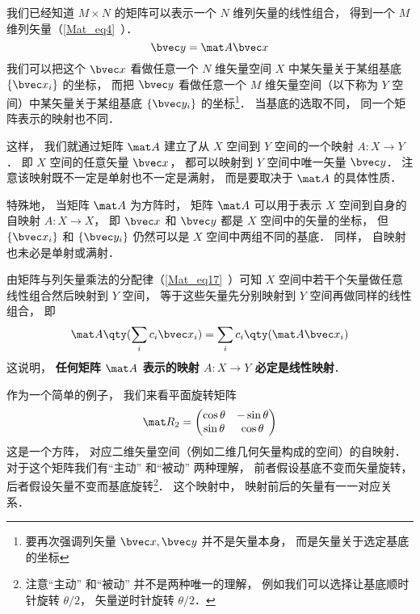 


我们已经知道 $M\times N$ 的矩阵可以表示一个 $N$ 维列矢量的线性组合， 得到一个 $M$ 维列矢量（\autoref{Mat_eq4}~）．
\begin{equation}\label{MatLS_eq1}
\bvec y = \mat A \bvec x
\end{equation}
我们可以把这个 $\bvec x$ 看做任意一个 $N$ 维矢量空间 $X$ 中某矢量关于某组基底 $\{\bvec x_i\}$ 的坐标， 而把 $\bvec y$ 看做任意一个 $M$ 维矢量空间（以下称为 $Y$ 空间）中某矢量关于某组基底 $\{\bvec y_i\}$ 的坐标\footnote{要再次强调列矢量 $\bvec x, \bvec y$ 并不是矢量本身， 而是矢量关于选定基底的坐标}． 当基底的选取不同， 同一个矩阵表示的映射也不同．

这样， 我们就通过矩阵 $\mat A$ 建立了从 $X$ 空间到 $Y$ 空间的一个映射 $A:X\to Y$． 即 $X$ 空间的任意矢量 $\bvec x$， 都可以映射到 $Y$ 空间中唯一矢量 $\bvec y$． 注意该映射既不一定是单射也不一定是满射， 而是要取决于 $\mat A$ 的具体性质．

特殊地， 当矩阵 $\mat A$ 为方阵时， 矩阵 $\mat A$ 可以用于表示 $X$ 空间到自身的自映射 $A:X\to X$， 即 $\bvec x$ 和 $\bvec y$ 都是 $X$ 空间中的矢量的坐标， 但 $\{\bvec x_i\}$ 和 $\{\bvec y_i\}$ 仍然可以是 $X$ 空间中两组不同的基底． 同样， 自映射也未必是单射或满射．

由矩阵与列矢量乘法的分配律（\autoref{Mat_eq17}~）可知 $X$ 空间中若干个矢量做任意线性组合然后映射到 $Y$ 空间， 等于这些矢量先分别映射到 $Y$ 空间再做同样的线性组合， 即
\begin{equation}
\mat A \qty(\sum_i c_i \bvec x_i) = \sum_i c_i \qty(\mat A \bvec x_i)
\end{equation}
这说明， \textbf{任何矩阵 $\mat A$ 表示的映射 $A:X\to Y$ 必定是线性映射}．

作为一个简单的例子， 我们来看平面旋转矩阵
\begin{equation}
\mat R_2 = \begin{pmatrix}
\cos\theta & - \sin\theta\\
\sin\theta &\cos\theta
\end{pmatrix}
\end{equation}
这是一个方阵， 对应二维矢量空间（例如二维几何矢量构成的空间）的自映射． 对于这个矩阵我们有“主动” 和“被动” 两种理解， 前者假设基底不变而矢量旋转， 后者假设矢量不变而基底旋转\footnote{注意“主动” 和“被动” 并不是两种唯一的理解， 例如我们可以选择让基底顺时针旋转 $\theta/2$， 矢量逆时针旋转 $\theta/2$．}． 这个映射中， 映射前后的矢量有一一对应关系．

